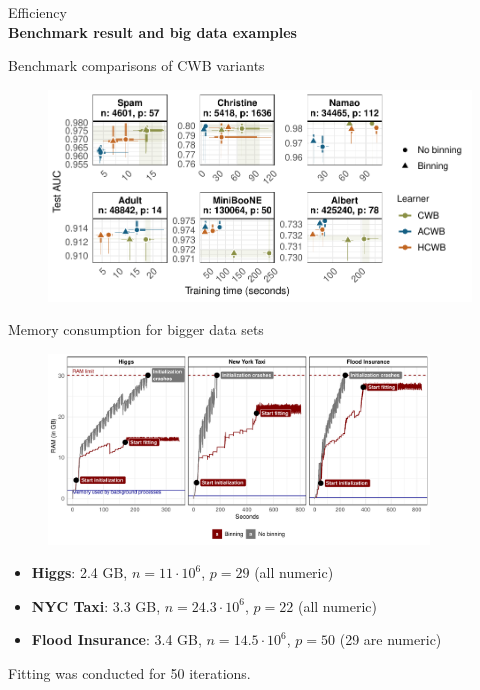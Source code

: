 \documentclass[t,10pt]{beamer}
\newcommand{\fSlide}[2]{
\begin{frame}[plain]{}%
  \vspace{4cm}%
  \Large #1\\[0.2cm]%
  {\LARGE\textbf{#2}}%
	\addtocounter{framenumber}{-1}%
\end{frame}%
}
\begin{document}
\fSlide{Efficiency}{Benchmark result and big data examples}


\begin{frame}{Benchmark comparisons of CWB variants}
  \begin{figure}
    \centering
    \includegraphics[width=\textwidth]{figures/fig-cacb-benchmark.pdf}
  \end{figure}
\end{frame}

\begin{frame}{Memory consumption for bigger data sets}
  \begin{figure}
    \centering
    \includegraphics[width=0.9\textwidth]{figures/fig-cacb-big-data.pdf}
  \end{figure}\vspace{-0.5cm}
  \begin{itemize}
      \item \textbf{Higgs}: 2.4 GB, $n = 11\cdot 10^6$, $p = 29$ (all numeric)
      \item \textbf{NYC Taxi}: 3.3 GB, $n = 24.3\cdot 10^6$, $p = 22$ (all numeric)
      \item \textbf{Flood Insurance}: 3.4 GB, $n = 14.5\cdot 10^6$, $p = 50$ (29 are numeric)
  \end{itemize} 
  {\scriptsize Fitting was conducted for 50 iterations.}
\end{frame}
\end{document}
